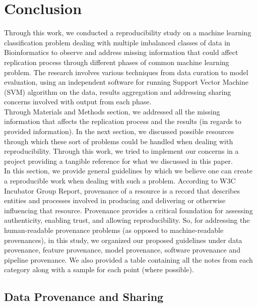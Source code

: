 \section {Conclusion}


Through this work, we conducted a reproducibility study on a machine learning classification problem dealing with multiple imbalanced 
classes of data in Bioinformatics to observe and address missing information that could affect replication process through 
different phases of common machine learning problem. The research involves various techniques from data curation to model evaluation, 
using an independent software for running Support Vector Machine (SVM) algorithm on the data, results aggregation and addressing 
sharing concerns involved with output from each phase.\\

Through Materials and Methods section, we addressed all the missing information that affects the replication process and the results (in 
regards to provided information). In the next section, we discussed possible resources through which these sort of problems 
could be handled when dealing with reproducibility. Through this work, we tried to implement our concerns in a project providing 
a tangible reference for what we discussed in this paper.\\ 

In this section, we provide general guidelines by which we believe one can create a reproducible work when dealing with such a problem. 
According to W3C Incubator Group Report, provenance of a resource is a record that describes entities and processes involved in producing 
and delivering or otherwise influencing that resource. Provenance provides a critical foundation for assessing authenticity, enabling trust, and allowing reproducibility.\cite{w3c} So, for addressing the human-readable provenance problems (as opposed to machine-readable provenances), 
in this study, we organized our proposed guidelines under data provenance, feature provenance, model provenance, software provenance 
and pipeline provenance. We also provided a table containing all the notes from each category along with a sample for each point (where possible).\\ 

\subsection{Data Provenance and Sharing}


